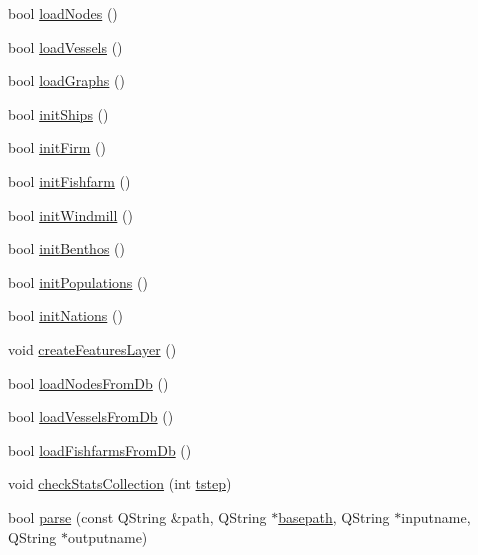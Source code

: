 \begin{DoxyCompactItemize}
\item 
bool \mbox{\hyperlink{class_displace_model_a23eaed735312875b66958c4e5de6093f}{load\+Nodes}} ()
\item 
bool \mbox{\hyperlink{class_displace_model_ab5f0aed60301a1cee65c649dec713428}{load\+Vessels}} ()
\item 
bool \mbox{\hyperlink{class_displace_model_a657ac3dd1a2a8b8616a9de34ff9fd6ea}{load\+Graphs}} ()
\item 
bool \mbox{\hyperlink{class_displace_model_a1194f6e597459c305bdaf9e0c4b06bb8}{init\+Ships}} ()
\item 
bool \mbox{\hyperlink{class_displace_model_a1fc67ed4597e86906b49790babe54573}{init\+Firm}} ()
\item 
bool \mbox{\hyperlink{class_displace_model_a250d86a5f096568c9f797647b96fd481}{init\+Fishfarm}} ()
\item 
bool \mbox{\hyperlink{class_displace_model_a435e83b76983232441f0d9be85242af5}{init\+Windmill}} ()
\item 
bool \mbox{\hyperlink{class_displace_model_a94e2ae0c016042fed2ed777dc952f898}{init\+Benthos}} ()
\item 
bool \mbox{\hyperlink{class_displace_model_af6405631576afa966014afc65b20dfc2}{init\+Populations}} ()
\item 
bool \mbox{\hyperlink{class_displace_model_a010c90ebfe7ee4e3e44f761a5323f4b8}{init\+Nations}} ()
\item 
void \mbox{\hyperlink{class_displace_model_aed334d9c1513d1e21f9e66f800258b16}{create\+Features\+Layer}} ()
\item 
bool \mbox{\hyperlink{class_displace_model_a1c71c71e1e46dfc429950fbafd10613a}{load\+Nodes\+From\+Db}} ()
\item 
bool \mbox{\hyperlink{class_displace_model_aac4cf73ac340223c95d3a0a1d088c38e}{load\+Vessels\+From\+Db}} ()
\item 
bool \mbox{\hyperlink{class_displace_model_a5e0ced25dcc4c4307ac3c78b3e1c43b5}{load\+Fishfarms\+From\+Db}} ()
\item 
void \mbox{\hyperlink{class_displace_model_addc9042dfab7c97629b36cabc06efa77}{check\+Stats\+Collection}} (int \mbox{\hyperlink{thread__vessels_8cpp_a84bc73d278de929ec9974e1a95d9b23a}{tstep}})
\item 
bool \mbox{\hyperlink{class_displace_model_a375f6f9df87d13214aa89f30daee9c96}{parse}} (const Q\+String \&path, Q\+String $\ast$\mbox{\hyperlink{class_displace_model_aa8fa2854364ea575cd28871442314b66}{basepath}}, Q\+String $\ast$inputname, Q\+String $\ast$outputname)

\end{DoxyCompactItemize}
